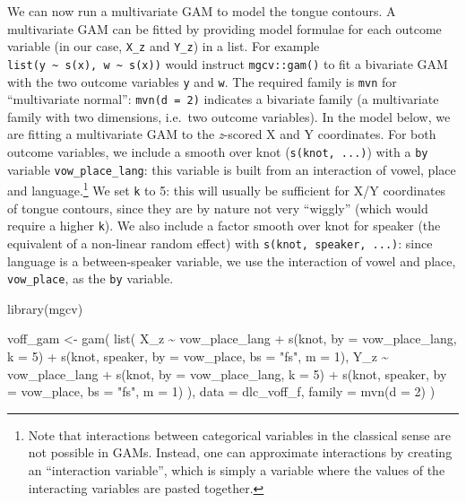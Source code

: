 \documentclass[
]{interact}
\newenvironment{Shaded}{\begin{snugshade}}{\end{snugshade}}
\newcommand{\AttributeTok}[1]{\textcolor[rgb]{0.40,0.45,0.13}{#1}}
\newcommand{\DecValTok}[1]{\textcolor[rgb]{0.68,0.00,0.00}{#1}}
\newcommand{\FunctionTok}[1]{\textcolor[rgb]{0.28,0.35,0.67}{#1}}
\newcommand{\NormalTok}[1]{\textcolor[rgb]{0.00,0.23,0.31}{#1}}
\newcommand{\OtherTok}[1]{\textcolor[rgb]{0.00,0.23,0.31}{#1}}
\newcommand{\SpecialCharTok}[1]{\textcolor[rgb]{0.37,0.37,0.37}{#1}}
\newcommand{\StringTok}[1]{\textcolor[rgb]{0.13,0.47,0.30}{#1}}
\begin{document}
We can now run a multivariate GAM to model the tongue contours. A
multivariate GAM can be fitted by providing model formulae for each
outcome variable (in our case, \texttt{X\_z} and \texttt{Y\_z}) in a
list. For example
\texttt{list(y\ \textasciitilde{}\ s(x),\ w\ \textasciitilde{}\ s(x))}
would instruct \texttt{mgcv::gam()} to fit a bivariate GAM with the two
outcome variables \texttt{y} and \texttt{w}. The required family is
\texttt{mvn} for ``multivariate normal'': \texttt{mvn(d\ =\ 2)}
indicates a bivariate family (a multivariate family with two dimensions,
i.e.~two outcome variables). In the model below, we are fitting a
multivariate GAM to the \emph{z}-scored X and Y coordinates. For both
outcome variables, we include a smooth over knot
(\texttt{s(knot,\ ...)}) with a \texttt{by} variable
\texttt{vow\_place\_lang}: this variable is built from an interaction of
vowel, place and language.\footnote{Note that interactions between
  categorical variables in the classical sense are not possible in GAMs.
  Instead, one can approximate interactions by creating an ``interaction
  variable'', which is simply a variable where the values of the
  interacting variables are pasted together.} We set \texttt{k} to 5:
this will usually be sufficient for X/Y coordinates of tongue contours,
since they are by nature not very ``wiggly'' (which would require a
higher \texttt{k}). We also include a factor smooth over knot for
speaker (the equivalent of a non-linear random effect) with
\texttt{s(knot,\ speaker,\ ...)}: since language is a between-speaker
variable, we use the interaction of vowel and place,
\texttt{vow\_place}, as the \texttt{by} variable.

\begin{Shaded}
\begin{Highlighting}[]
\FunctionTok{library}\NormalTok{(mgcv)}

\NormalTok{voff\_gam }\OtherTok{\textless{}{-}} \FunctionTok{gam}\NormalTok{(}
  \FunctionTok{list}\NormalTok{(}
\NormalTok{    X\_z }\SpecialCharTok{\textasciitilde{}}\NormalTok{ vow\_place\_lang }\SpecialCharTok{+}
      \FunctionTok{s}\NormalTok{(knot, }\AttributeTok{by =}\NormalTok{ vow\_place\_lang, }\AttributeTok{k =} \DecValTok{5}\NormalTok{) }\SpecialCharTok{+}
      \FunctionTok{s}\NormalTok{(knot, speaker, }\AttributeTok{by =}\NormalTok{ vow\_place, }\AttributeTok{bs =} \StringTok{"fs"}\NormalTok{, }\AttributeTok{m =} \DecValTok{1}\NormalTok{),}
\NormalTok{    Y\_z }\SpecialCharTok{\textasciitilde{}}\NormalTok{ vow\_place\_lang }\SpecialCharTok{+}
      \FunctionTok{s}\NormalTok{(knot, }\AttributeTok{by =}\NormalTok{ vow\_place\_lang, }\AttributeTok{k =} \DecValTok{5}\NormalTok{) }\SpecialCharTok{+}
      \FunctionTok{s}\NormalTok{(knot, speaker, }\AttributeTok{by =}\NormalTok{ vow\_place, }\AttributeTok{bs =} \StringTok{"fs"}\NormalTok{, }\AttributeTok{m =} \DecValTok{1}\NormalTok{)}
\NormalTok{  ),}
  \AttributeTok{data =}\NormalTok{ dlc\_voff\_f,}
  \AttributeTok{family =} \FunctionTok{mvn}\NormalTok{(}\AttributeTok{d =} \DecValTok{2}\NormalTok{)}
\NormalTok{)}
\end{Highlighting}
\end{Shaded}
\end{document}
